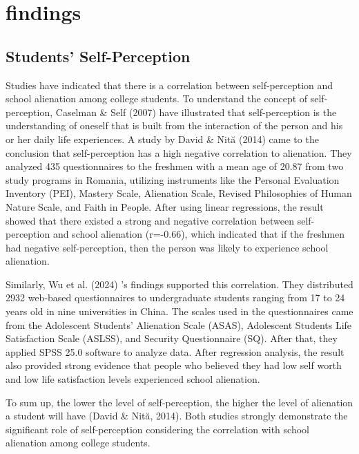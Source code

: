 \documentclass{studentpaper}
\begin{document}
\section{findings}
\subsection{Students’ Self-Perception }
\par
Studies have indicated that there is a correlation between self-perception and school 
alienation among college students. To understand the concept of self-perception, Caselman \& 
Self (2007) have illustrated that self-perception is the understanding of oneself that is built from 
the interaction of the person and his or her daily life experiences. A study by David \& Nită 
(2014) came to the conclusion that self-perception has a high negative correlation to alienation. 
They analyzed 435 questionnaires to the freshmen with a mean age of 20.87 from two study 
programs in Romania, utilizing instruments like the Personal Evaluation Inventory (PEI), 
Mastery Scale, Alienation Scale, Revised Philosophies of Human Nature Scale, and Faith in 
People.  After using linear regressions, the result showed that there existed a strong and negative 
correlation between self-perception and school alienation (r=-0.66), which indicated that if the 
freshmen had negative self-perception, then the person was likely to experience school 
alienation.
\par
Similarly, Wu et al. (2024) ’s findings supported this correlation. They distributed 2932 
web-based questionnaires to undergraduate students ranging from 17 to 24 years old in nine 
universities in China. The scales used in the questionnaires came from the Adolescent Students’ 
Alienation Scale (ASAS), Adolescent Students Life Satisfaction Scale (ASLSS), and Security 
Questionnaire (SQ). After that, they applied SPSS 25.0 software to analyze data. 
After regression analysis, the result also provided strong evidence that people who believed they had low self
worth and low life satisfaction levels experienced school alienation. 
\par
To sum up, the lower the level of self-perception, the higher the level of alienation a 
student will have (David \& Nită, 2014). Both studies strongly demonstrate the significant role of 
self-perception considering the correlation with school alienation among college students.
\end{document}
